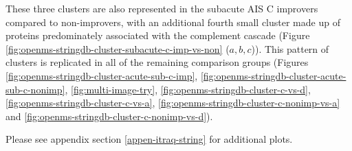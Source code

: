 \documentclass[
]{article}
\begin{document}
These three clusters are also represented in the subacute AIS C improvers compared to non-improvers, with an additional fourth small cluster made up of proteins predominately associated with the complement cascade (Figure \ref{fig:openms-stringdb-cluster-subacute-c-imp-vs-non} (\(a,b,c\))).
This pattern of clusters is replicated in all of the remaining comparison groups (Figures \ref{fig:openms-stringdb-cluster-acute-sub-c-imp}, \ref{fig:openms-stringdb-cluster-acute-sub-c-nonimp}, \ref{fig:multi-image-try}, \ref{fig:openms-stringdb-cluster-c-vs-d}, \ref{fig:openms-stringdb-cluster-c-vs-a}, \ref{fig:openms-stringdb-cluster-c-nonimp-vs-a} and \ref{fig:openms-stringdb-cluster-c-nonimp-vs-d}).

Please see appendix section \ref{appen-itraq-string} for additional plots.

\clearpage
\end{document}
